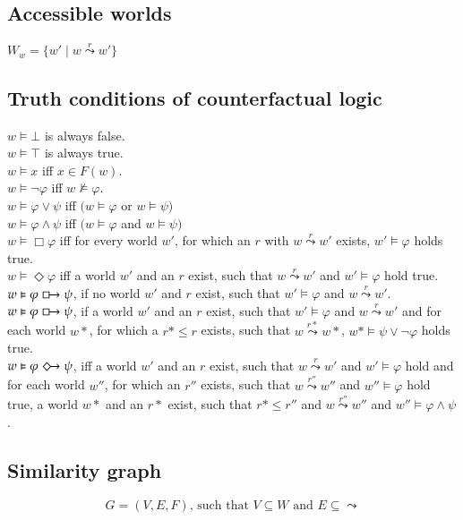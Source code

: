 \documentclass[a4paper,american]{paper}
\begin{document}
\subsection{Accessible worlds}
$W_w = \{w'\mid w \overset{r}{\leadsto} w'\}$

\newpage
\subsection{Truth conditions of counterfactual logic}
$w \vDash \bot$ is always false. \\
$w \vDash \top$ is always true. \\
$w \vDash x$ iff $x \in F(w)$. \\
$w \vDash \neg \varphi$ iff $w \nvDash \varphi$. \\
$w \vDash \varphi \vee \psi$ iff $(w \vDash \varphi$ or $w \vDash \psi)$ \\
$w \vDash \varphi \wedge \psi$ iff $(w \vDash \varphi$ and $w \vDash \psi)$ \\
$w \vDash \Box \varphi$ iff for every world $w'$, for which an $r$ with $w\overset{r}{\leadsto} w'$ exists, $w' \vDash \varphi$ holds true. \\
$w \vDash \Diamond \varphi$ iff a world $w'$ and an $r$ exist, such that $w\overset{r}{\leadsto} w'$ and $w' \vDash \varphi$ hold true. \\
$w \vDash \varphi \boxright \psi$, if no world $w'$ and $r$ exist, such that $w' \vDash \varphi$ and $w\overset{r}{\leadsto} w'$. \\
$w \vDash \varphi \boxright \psi$, if a world $w'$ and an $r$ exist, such that $w'\vDash \varphi$ and $w\overset{r}{\leadsto} w'$ and for each world $w*$, for which a $r*\leq r$ exists, such that $w\overset{r*}{\leadsto} w*$, $w*\vDash\psi\vee\neg\varphi$ holds true. \\
$w \vDash \varphi \Diamondright \psi$, iff a world $w'$ and an $r$ exist, such that $w\overset{r}{\leadsto} w'$ and $w' \vDash \varphi$ hold and for each world $w''$, for which an $r''$ exists, such that $w\overset{r''}{\leadsto}w''$ and $w'' \vDash \varphi$ hold true, a world $w*$ and an $r*$ exist, such that $r* \leq r''$ and $w\overset{r''}{\leadsto}w''$ and $w'' \vDash \varphi \wedge \psi$.
\subsection{Similarity graph}
\begin{equation}
	G = (V,E,F)\text{, such that }V \subseteq W\text{ and }E \subseteq \leadsto
\end{equation}
\end{document}
